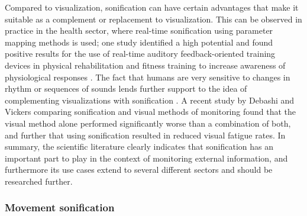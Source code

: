 \documentclass[10pt,a4paper,onecolumn]{article}
\begin{document}
Compared to visualization, sonification can have certain advantages that make it suitable as a complement or replacement to visualization. This can be observed in practice in the health sector, where real-time sonification using parameter mapping methods is used; one study identified a high potential and found positive results for the use of real-time auditory feedback-oriented training devices in physical rehabilitation and fitness training to increase awareness of physiological responses \autocite{yangRealtimeSonificationBiceps2015}. The fact that humans are very sensitive to changes in rhythm or sequences of sounds lends further support to the idea of complementing visualizations with sonification \autocite{hildebrandtShortPaperEnhancing2014}. A recent study by Debashi and Vickers \autocite{debashiSonificationNetworkTraffic2018} comparing sonification and visual methods of monitoring found that the visual method alone performed significantly worse than a combination of both, and further that using sonification resulted in reduced visual fatigue rates. In summary, the scientific literature clearly indicates that sonification has an important part to play in the context of monitoring external information, and furthermore its use cases extend to several different sectors and should be researched further.

\hypertarget{movement-sonification}{%
\subsubsection{Movement sonification}\label{movement-sonification}}
\end{document}
